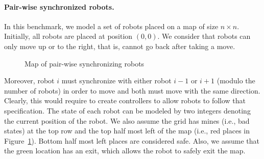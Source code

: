 \paragraph{Pair-wise synchronized robots.} 
In this benchmark, we model a set of robots placed on a map of size $n \times n$. Initially, all robots are placed at position $(0, 0)$. We consider that robots can only move up or to the right, that is, cannot go back after taking a move.
%
\begin{figure}
\centering
{}
\caption{Map of pair-wise synchronizing robots}
\label{fig:map-robots}
\end{figure}
%
Moreover, robot $i$ must synchronize with either robot $i-1$ or $i+1$ (modulo the number of robots) in order to move and both must move with the same direction. Clearly, this would require to create controllers to allow robots to follow that specification. The state of each robot can be modeled by two integers denoting the current position of the robot. We also assume the grid has mines (i.e., bad states) at the top row and the top half most left of the map (i.e., red places in Figure~\ref{fig:map-robots}). 
%
Bottom half most left places are considered safe. Also, we assume that the green location has an exit, which allows the robot to safely exit the map.   

